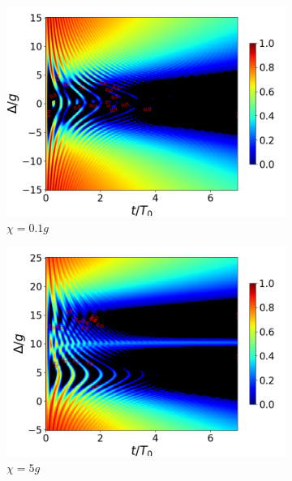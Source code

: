 \begin{figure}[H]
    \vfill
    \begin{subfigure}{0.49\textwidth}
        \includegraphics[width=\textwidth]{figuras/ch4/concu/delta/eg1+ge1 k=0.0g x=0.1g J=0.0g gamma=0.25g concu delta dis.png}
        \caption{$\chi=0.1g$}
        \label{fig4:concu detunning 1 x1}
    \end{subfigure}
    \hfill
    \begin{subfigure}{0.49\textwidth}
        \includegraphics[width=\textwidth]{figuras/ch4/concu/delta/eg1+ge1 k=0.0g x=5.0g J=0.0g gamma=0.25g concu delta dis.png}
        \caption{$\chi=5g$}
        \label{fig4:concu detunning 1 x2}
    \end{subfigure}
    \vfill
    \begin{subfigure}{0.49\textwidth}

\end{subfigure}
\end{figure}
